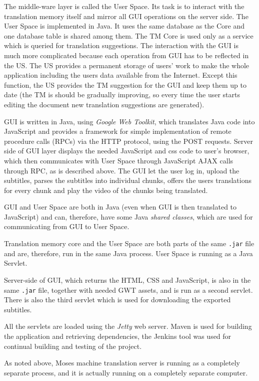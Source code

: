The middle-ware layer is called the User Space. Its task is to interact with the translation memory itself and mirror all GUI operations on the server side. The User Space is implemented in Java. It uses the same database as the Core and one database table is shared among them. The TM Core is used only as a service which is queried for translation suggestions. The interaction with the GUI is much more complicated because each operation from GUI has to be reflected in the US. The US provides a permanent storage of users' work to make the whole application including the users data available from the Internet. Except this function, the US provides the TM suggestion for the GUI and keep them up to date (the TM is should be gradually improving, so every time the user starts editing the document new translation suggestions are generated).

GUI is written in Java, using \emph{Google Web Toolkit}, which translates Java code into JavaScript and provides a framework for simple implementation of remote procedure calls (RPCs) via the HTTP protocol, using the POST requests. Server side of GUI layer displays the needed JavaScript and css code to user's browser, which then communicates with User Space through JavaScript AJAX calls through RPC, as is described above. The GUI let the user log in, upload the subtitles, parses the subtitles into individual chunks, offers the users translations for every chunk and play the video of the chunks being translated.

GUI and User Space are both in Java (even when GUI is then translated to JavaScript) and can, therefore, have some Java \emph{shared classes}, which are used for communicating from GUI to User Space.

Translation memory core and the User Space are both parts of the same \texttt{.jar} file and are, therefore, run in the same Java process. User Space is running as a Java Servlet.

Server-side of GUI, which returns the HTML, CSS and JavaScript, is also in the same \texttt{.jar} file, together with needed GWT assets, and is run as a second servlet. There is also the third servlet which is used for downloading the exported subtitles.

All the servlets are loaded using the \emph{Jetty} web server. Maven is used for building the application and retrieving dependencies, the Jenkins tool was used for continual building and testing of the project.

As noted above, Moses machine translation server is running as a completely separate process, and it is actually running on a completely separate computer.

